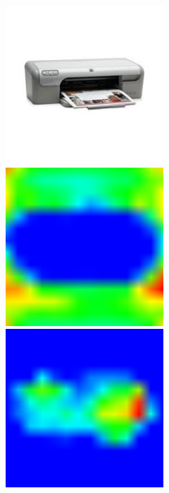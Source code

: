 \documentclass[../main.tex]{subfiles}
\begin{document}
    \begin{figure}[h!]
        \centering

        \begin{subfigure}{\linewidth}
        	\includegraphics[width=.3\linewidth]{img/a1.png}\label{fig:amazon-1}\hfill
        	\includegraphics[width=.3\linewidth]{img/a-ad-a-1.png}\label{fig:amazon-amazon-1}\hfill
            \includegraphics[width=.3\linewidth]{img/a-ad-d-1.png}\label{fig:amazon-dslr-1}
        \end{subfigure}


\end{figure}
\end{document}
